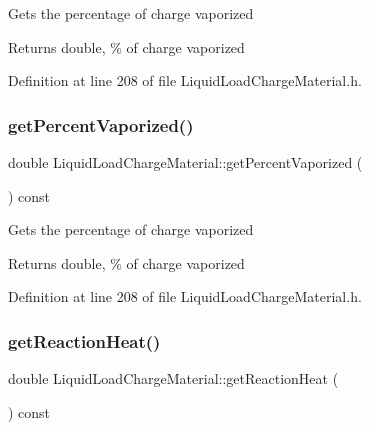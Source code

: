 Gets the percentage of charge vaporized \begin{DoxyReturn}{Returns}
double, \% of charge vaporized 
\end{DoxyReturn}


Definition at line 208 of file Liquid\+Load\+Charge\+Material.\+h.

\mbox{\label{class_liquid_load_charge_material_a8e55b0df0a0551671636bcf169228dca}} 
\subsubsection{\texorpdfstring{get\+Percent\+Vaporized()}{getPercentVaporized()}\hspace{0.1cm}{\footnotesize\ttfamily [3/3]}}
{\footnotesize\ttfamily double Liquid\+Load\+Charge\+Material\+::get\+Percent\+Vaporized (\begin{DoxyParamCaption}{ }\end{DoxyParamCaption}) const\hspace{0.3cm}{\ttfamily [inline]}}

Gets the percentage of charge vaporized \begin{DoxyReturn}{Returns}
double, \% of charge vaporized 
\end{DoxyReturn}


Definition at line 208 of file Liquid\+Load\+Charge\+Material.\+h.

\mbox{\label{class_liquid_load_charge_material_a2f0c26e789e98efd1e8fd0c8741ddd92}} 
\subsubsection{\texorpdfstring{get\+Reaction\+Heat()}{getReactionHeat()}\hspace{0.1cm}{\footnotesize\ttfamily [1/3]}}
{\footnotesize\ttfamily double Liquid\+Load\+Charge\+Material\+::get\+Reaction\+Heat (\begin{DoxyParamCaption}{ }\end{DoxyParamCaption}) const\hspace{0.3cm}{\ttfamily [inline]}}


